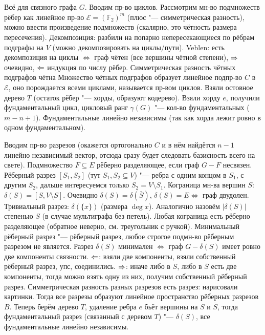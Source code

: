 \section{} %
Всё для связного графа $G$.
Вводим пр-во циклов.
Рассмотрим мн-во подмножеств рёбер как линейное пр-во $\mathcal E = (\mathbb F_2)^m$
(плюс "--- симметрическая разность), можно ввести произведение подмножеств
(скалярно, это чётность размера пересечения).
Декомпозиция: разбили на попарно непересекающиеся по рёбрам подграфы на $V$
(можно декомпозировать на циклы/пути).
Veblen: есть декомпозиция на циклы $\iff$ граф чётен (все вершины чётной степени),
$\Rightarrow$ очевидно, $\Leftarrow$ индукция по числу рёбер.
Симметрическая разность чётных подграфов чётна
Множество чётных подграфов образует линейное подпр-во $C$ в $\mathcal E$,
оно порождается всеми циклами, называется пр-вом циклов.
Взяли остовное дерево $T$ (остаток рёбер "--- хорды, образуют кодерево).
Взяли хорду $e$, получили фундаментальный цикл, цикловый ранг $\gamma(G)$ "---
кол-во фундаментальных ($m-n+1$).
Фундаментальные линейно независимы (так как хорда лежит ровно в одном фундаментальном).

Вводим пр-во разрезов (окажется ортогонально $C$ и в нём найдётся $n-1$ линейно независимый вектор,
отсюда сразу будет следовать базисность всего на свете).
Подмножество $F\subseteq E$ рёберно разделяющее, если граф $G-F$ несвязен.
Рёберный разрез $[S_1, S_2]$ (тут $S_1, S_2 \subseteq V$) "--- ребра с одним концом
в $S_1$, с другим $S_2$, дальше интересуемся только $S_2=V\setminus S_1$.
Кограница мн-ва вершин $S$: $\delta(S)=[S,V\setminus S]$.
Очевидно $\delta(S)=\delta(\bar S)$, $\delta(S)=E \iff$ граф двудолен.
Тривиальный разрез: $\delta(\{x\})$ (размера $\deg x$).
Аналогично назовём $|\delta(S)|$ степенью $S$ (в случае мультиграфа без петель).
Любая кограница есть рёберно разделяющее (обратное неверно, см. треугольник с ручкой).
Минимальный рёберный разрез "--- рёберный разрез, любое строгое подмн-во рёберным разрезом не является.
Разрез $\delta(S)$ минимален $\iff$ граф $G - \delta(S)$ имеет ровно две компоненты связности.
$\Leftarrow$: взяли две компоненты, взяли собственный рёберный разрез, упс, соединились.
$\Rightarrow$: иначе либо в $S$, либо в $\bar S$ есть две компоненты, тогда можно взять одну из них,
получим собственный рёберный разрез.
Симметрическая разность разных разрезов есть разрез: нарисовали картинки.
Тогда все разрезы образуют линейное пространство рёберных разрезов $B$.
Теперь берём дерево $T$, удаление ребра $e$ бьёт вершины на $S$ и $\bar S$,
тогда фундаментальный разрез (связанный с деревом $T$) "--- $\delta(S)$,
все фундаментальные линейно независимы.

